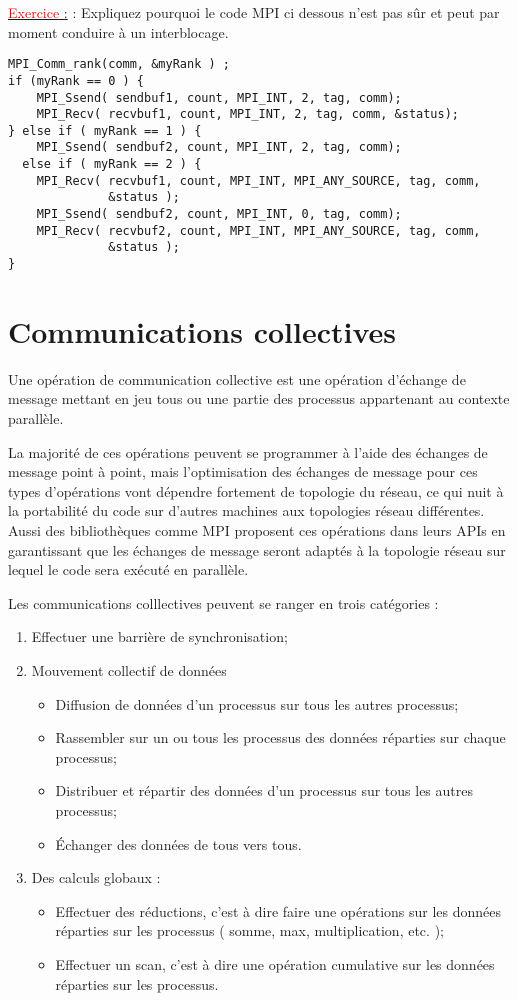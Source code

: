 \documentclass[fleqn,11pt]{article}
\begin{document}
\underline{\textcolor{red}{Exercice} :} : Expliquez pourquoi le code MPI ci dessous n'est pas sûr et peut par moment
conduire à un interblocage.

\begin{lstlisting}
MPI_Comm_rank(comm, &myRank ) ;
if (myRank == 0 ) {
    MPI_Ssend( sendbuf1, count, MPI_INT, 2, tag, comm);
    MPI_Recv( recvbuf1, count, MPI_INT, 2, tag, comm, &status);
} else if ( myRank == 1 ) {
    MPI_Ssend( sendbuf2, count, MPI_INT, 2, tag, comm);
  else if ( myRank == 2 ) {
    MPI_Recv( recvbuf1, count, MPI_INT, MPI_ANY_SOURCE, tag, comm, 
              &status );
    MPI_Ssend( sendbuf2, count, MPI_INT, 0, tag, comm);
    MPI_Recv( recvbuf2, count, MPI_INT, MPI_ANY_SOURCE, tag, comm, 
              &status );
}
\end{lstlisting}

\section{Communications collectives}

Une opération de communication collective est une opération d'échange de message
mettant en jeu tous ou une partie des processus appartenant au contexte
parallèle.

La majorité de ces opérations peuvent se programmer à l'aide des échanges de
message point à point, mais l'optimisation des échanges de message pour ces
types d'opérations vont dépendre fortement de topologie du réseau, ce qui nuit
à la portabilité du code sur d'autres machines aux topologies réseau différentes. 
Aussi des bibliothèques comme MPI proposent ces opérations dans leurs APIs en garantissant
que les échanges de message seront adaptés à la topologie réseau sur lequel le code sera
exécuté en parallèle.

Les communications colllectives peuvent se ranger en trois catégories :
\begin{enumerate}
\item Effectuer une barrière de synchronisation;
\item Mouvement collectif de données
  \begin{itemize}
  \item Diffusion de données d'un processus sur tous les autres processus;
  \item Rassembler sur un ou tous les processus des données réparties sur
  chaque processus;
  \item Distribuer et répartir des données d'un processus sur tous les autres 
  processus;
  \item \'Echanger des données de tous vers tous.
  \end{itemize}
\item Des calculs globaux :
  \begin{itemize}
  \item Effectuer des réductions, c'est à dire faire une opérations sur les données réparties
  sur les processus ( somme, max, multiplication, etc. );
  \item Effectuer un scan, c'est à dire une opération cumulative sur les données réparties
  sur les processus.
  \end{itemize}
\end{enumerate}
\end{document}

